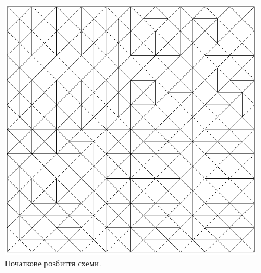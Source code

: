\begin{figure}[H]
	\centering
    \includegraphics[scale=0.7]{problem1/InitialMesh}
    \caption{Початкове розбиття схеми.}
    \label{fig:init_mesh1}
\end{figure}


